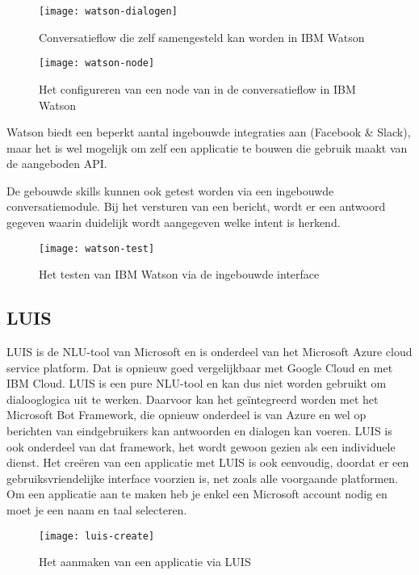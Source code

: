 \begin{figure}[H]
    \label{fig:watson-dialogen}
    \centering
    \texttt{[image: watson-dialogen]}
    \caption{Conversatieflow die zelf samengesteld kan worden in IBM Watson}
\end{figure}

\begin{figure}[H]
    \label{fig:watson-node}
    \centering
    \texttt{[image: watson-node]}
    \caption{Het configureren van een node van in de conversatieflow in IBM Watson}
\end{figure}

Watson biedt een beperkt aantal ingebouwde integraties aan (Facebook \& Slack), maar het is wel mogelijk om zelf een applicatie te bouwen die gebruik maakt van de aangeboden API.

De gebouwde skills kunnen ook getest worden via een ingebouwde conversatiemodule. Bij het versturen van een bericht, wordt er een antwoord gegeven waarin duidelijk wordt aangegeven welke intent is herkend.

\begin{figure}[H]
    \label{fig:watson-test}
    \centering
    \texttt{[image: watson-test]}
    \caption{Het testen van IBM Watson via de ingebouwde interface}
\end{figure}

\subsection{LUIS}
\label{subsec:werking-platformen-luis}

LUIS is de NLU-tool van Microsoft en is onderdeel van het Microsoft Azure cloud service platform. Dat is opnieuw goed vergelijkbaar met Google Cloud en met IBM Cloud. LUIS is een pure NLU-tool en kan dus niet worden gebruikt om dialooglogica uit te werken. Daarvoor kan het geïntegreerd worden met het Microsoft Bot Framework, die opnieuw onderdeel is van Azure en wel op berichten van eindgebruikers kan antwoorden en dialogen kan voeren. LUIS is ook onderdeel van dat framework, het wordt gewoon gezien als een individuele dienst. Het creëren van een applicatie met LUIS is ook eenvoudig, doordat er een gebruiksvriendelijke interface voorzien is, net zoals alle voorgaande platformen. Om een applicatie aan te maken heb je enkel een Microsoft account nodig en moet je een naam en taal selecteren.

\begin{figure}[H]
    \label{fig:luis-create}
    \centering
    \texttt{[image: luis-create]}
    \caption{Het aanmaken van een applicatie via LUIS}
\end{figure}

